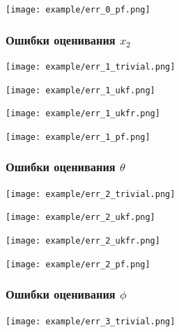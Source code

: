 \documentclass[12pt]{article}
\begin{document}
\begin{landscape}
	\texttt{[image: example/err\_0\_pf.png]}\newpage
\end{landscape}

\begin{landscape}
	\subsubsection{Ошибки оценивания $x_2$}
	\texttt{[image: example/err\_1\_trivial.png]}\newpage
\end{landscape}

\begin{landscape}
	\texttt{[image: example/err\_1\_ukf.png]}\newpage
\end{landscape}

\begin{landscape}
	\texttt{[image: example/err\_1\_ukfr.png]}\newpage
\end{landscape}

\begin{landscape}
	\texttt{[image: example/err\_1\_pf.png]}\newpage
\end{landscape}

\begin{landscape}
	\subsubsection{Ошибки оценивания $\theta$}
	\texttt{[image: example/err\_2\_trivial.png]}\newpage
\end{landscape}

\begin{landscape}
	\texttt{[image: example/err\_2\_ukf.png]}\newpage
\end{landscape}

\begin{landscape}
	\texttt{[image: example/err\_2\_ukfr.png]}\newpage
\end{landscape}

\begin{landscape}
	\texttt{[image: example/err\_2\_pf.png]}\newpage
\end{landscape}

\begin{landscape}
	\subsubsection{Ошибки оценивания $\phi$}
	\texttt{[image: example/err\_3\_trivial.png]}\newpage
\end{landscape}
\end{document}

